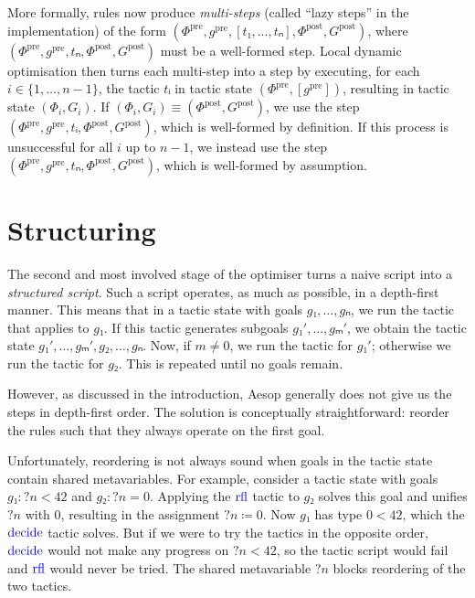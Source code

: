 \documentclass[sigplan,10pt,anonymous,review]{acmart}
\newcommand{\tac}[1]{\ensuremath{\mathrm{\mathcolor{blue}{#1}}}}
\newcommand{\mvar}[1]{{?#1}}
\newcommand{\pre}{\mathrm{pre}}
\newcommand{\post}{\mathrm{post}}
\newcommand{\step}[5]{\ensuremath{(#1,\allowbreak #2,\allowbreak #3,\allowbreak #4,\allowbreak #5)}}
\begin{document}
More formally, rules now produce \emph{multi-steps} (called \enquote{lazy steps} in the implementation) of the form $\step{Φ^{\pre}}{g^{\pre}}{[t₁, ..., tₙ]}{Φ^{\post}}{G^{\post}}$, where $\step{Φ^{\pre}}{g^{\pre}}{tₙ}{Φ^{\post}}{G^{\post}}$ must be a well-formed step.
Local dynamic optimisation then turns each multi-step into a step by executing, for each $i ∈ \{1, \dots, n-1\}$, the tactic $tᵢ$ in tactic state $(Φ^{\pre}, [g^{\pre}])$, resulting in tactic state $(Φ_{i}, G_{i})$.
If $(Φ_{i}, G_{i}) ≡ (Φ^{\post}, G^{\post})$, we use the step $(Φ^{\pre}, g^{\pre}, tᵢ, Φ^{\post}, G^{\post})$, which is well-formed by definition.
If this process is unsuccessful for all $i$ up to $n-1$, we instead use the step $(Φ^{\pre}, g^{\pre}, tₙ, Φ^{\post}, G^{\post})$, which is well-formed by assumption.

\section{Structuring}%
\label{sec:structuring}

The second and most involved stage of the optimiser turns a naive script into a \emph{structured script}.
Such a script operates, as much as possible, in a depth-first manner.
This means that in a tactic state with goals $g₁, \dots, gₙ$, we run the tactic that applies to $g₁$.
If this tactic generates subgoals $g₁', \dots, gₘ'$, we obtain the tactic state $g₁', \dots, gₘ', g₂, \dots, gₙ$.
Now, if $m ≠ 0$, we run the tactic for $g₁'$; otherwise we run the tactic for $g₂$.
This is repeated until no goals remain.

However, as discussed in the introduction, Aesop generally does not give us the steps in depth-first order.
The solution is conceptually straightforward: reorder the rules such that they always operate on the first goal.

Unfortunately, reordering is not always sound when goals in the tactic state contain shared metavariables.
For example, consider a tactic state with goals $g₁ : \mvar{n} < 42$ and $g₂ : \mvar{n} = 0$.
Applying the \tac{rfl} tactic to $g₂$ solves this goal and unifies $\mvar{n}$ with $0$, resulting in the assignment $\mvar{n} ≔ 0$.
Now $g₁$ has type $0 < 42$, which the \tac{decide} tactic solves.
But if we were to try the tactics in the opposite order, \tac{decide} would not make any progress on $\mvar{n} < 42$, so the tactic script would fail and \tac{rfl} would never be tried.
The shared metavariable $\mvar{n}$ blocks reordering of the two tactics.
\end{document}
